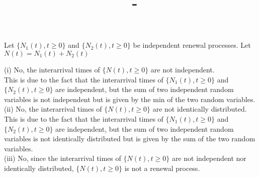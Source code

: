 \documentclass[answers,12pt,addpoints]{exam}
\author{\name}
\title{\course \ - \assignment}
\begin{document}
\maketitle


\newpage
\begin{questions}
    Let \(\{N_1(t), t \geq 0\}\) and \(\{N_2(t), t \geq 0\}\) be independent renewal processes. Let \(N(t) = N_1(t) + N_2(t)\)
    \begin{solution}
        (i) No, the interarrival times of \(\{N(t), t \geq 0\}\) are not independent.\\
        This is due to the fact that the interarrival times of \(\{N_1(t), t \geq 0\}\) and \(\{N_2(t), t \geq 0\}\) are independent, but the sum of two independent random variables is not independent but is given by the min of the two random variables.\\

        (ii) No, the interarrival times of \(\{N(t), t \geq 0\}\) are not identically distributed.\\
        This is due to the fact that the interarrival times of \(\{N_1(t), t \geq 0\}\) and \(\{N_2(t), t \geq 0\}\) are independent, but the sum of two independent random variables is not identically distributed but is given by the sum of the two random variables.\\

        (iii) No, since the interarrival times of \(\{N(t), t \geq 0\}\) are not independent nor identically distributed, \(\{N(t), t \geq 0\}\) is not a renewal process.\\

    \end{solution}


\end{questions}
\end{document}
